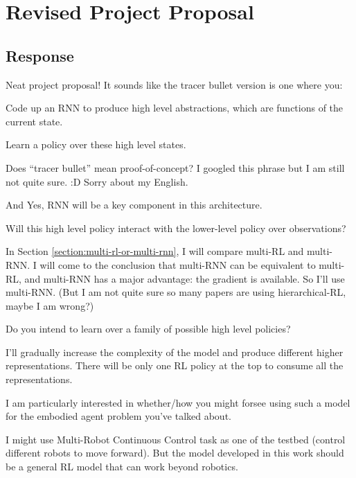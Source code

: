 



\section{Revised Project Proposal}

\subsection{Response}
\begin{tcolorbox}
    Neat project proposal! It sounds like the tracer bullet version is one where you:

    Code up an RNN to produce high level abstractions, which are functions of the current state.
    
    Learn a policy over these high level states.
\end{tcolorbox}
Does ``tracer bullet'' mean proof-of-concept? I googled this phrase but I am still not quite sure. :D Sorry about my English.

And Yes, RNN will be a key component in this architecture.

\begin{tcolorbox}
    Will this high level policy interact with the lower-level policy over observations?
\end{tcolorbox}
In Section \ref{section:multi-rl-or-multi-rnn}, I will compare multi-RL and multi-RNN. I will come to the conclusion that multi-RNN can be equivalent to multi-RL, and multi-RNN has a major advantage: the gradient is available.
So I'll use multi-RNN. (But I am not quite sure so many papers are using hierarchical-RL, maybe I am wrong?)

\begin{tcolorbox}
    Do you intend to learn over a family of possible high level policies?
\end{tcolorbox}
I'll gradually increase the complexity of the model and produce different higher representations.
There will be only one RL policy at the top to consume all the representations.

\begin{tcolorbox}
    I am particularly interested in whether/how you might forsee using such a model for the embodied agent problem you've talked about.
\end{tcolorbox}
I might use Multi-Robot Continuous Control task as one of the testbed (control different robots to move forward).
But the model developed in this work should be a general RL model that can work beyond robotics.


